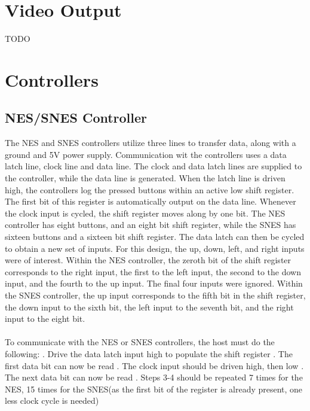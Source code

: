 \documentclass[]{article}
\begin{document}
\section{Video Output}
TODO

\section{Controllers}
\subsection{NES/SNES Controller}
The NES and SNES controllers utilize three lines to transfer data, along with a ground and 5V power supply. Communication wit the controllers uses a data latch line, clock line and data line. The clock and data latch lines are supplied to the controller, while the data line is generated. When the latch line is driven high, the controllers log the pressed buttons within an active low shift register. The first bit of this register is automatically output on the data line. Whenever the clock input is cycled, the shift register moves along by one bit. The NES controller has eight buttons, and an eight bit shift register, while the SNES has sixteen buttons and a sixteen bit shift register. The data latch can then be cycled to obtain a new set of inputs. For this design, the up, down, left, and right inputs were of interest. Within the NES controller, the zeroth bit of the shift register corresponds to the right input, the first to  the left input, the second to the down input, and the fourth to the up input. The final four inputs were ignored. Within the SNES controller, the up input corresponds to the fifth bit in the shift register, the down input to the sixth bit, the left input to the seventh bit, and the right input to the eight bit. \\~\\
To communicate with the NES or SNES controllers, the host must do the following:
. Drive the data latch input high to populate the shift register
. The first data bit can now be read
. The clock input should be driven high, then low
. The next data bit can now be read
. Steps 3-4 should be repeated 7 times for the NES, 15 times for the SNES(as the first bit of the register is already present, one less clock cycle is needed)
\end{document}

